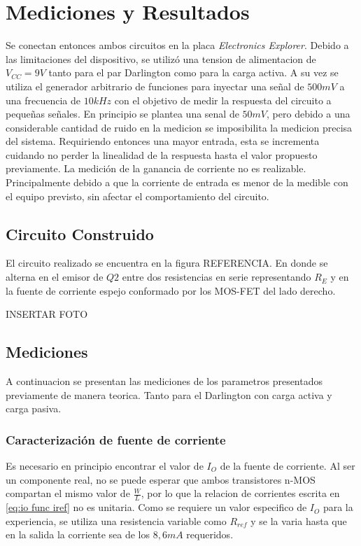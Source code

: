 \chapter{Mediciones y Resultados}
Se conectan entonces ambos circuitos en la placa \textit{Electronics Explorer}. Debido a las limitaciones del dispositivo, se utilizó una tension de alimentacion de $V_{CC} = 9V$ tanto para el par Darlington como para la carga activa.
A su vez se utiliza el generador arbitrario de funciones para inyectar una señal de $500 mV$ a una frecuencia de $10kHz$ con el objetivo de medir la respuesta del circuito a pequeñas señales. En principio se plantea una senal de $50 mV$, pero debido a una considerable cantidad de ruido en la medicion se imposibilita la medicion precisa del sistema.
Requiriendo entonces una mayor entrada, esta se incrementa cuidando no perder la linealidad de la respuesta hasta el valor propuesto previamente.
La medición de la ganancia de corriente no es realizable. Principalmente debido a que la corriente de entrada es menor de la medible con el equipo previsto, sin afectar el comportamiento del circuito.

\section{Circuito Construido}
El circuito realizado se encuentra en la figura REFERENCIA. En donde se alterna en el emisor de $Q2$ entre dos resistencias en serie representando $R_E$ y en la fuente de corriente espejo conformado por los MOS-FET del lado derecho.

INSERTAR FOTO


\section{Mediciones}
A continuacion se presentan las mediciones de los parametros presentados previamente de manera teorica. Tanto para el Darlington con carga activa y carga pasiva.

\subsection{Caracterización de fuente de corriente}

Es necesario en principio encontrar el valor de $I_O$ de la fuente de corriente. Al ser un componente real, no se puede esperar que ambos transistores n-MOS compartan el mismo valor de $\frac{W}{L}$, por lo que la relacion de corrientes escrita en \ref{eq:io func iref} no es unitaria.
Como se requiere un valor especifico de $I_O$ para la experiencia, se utiliza una resistencia variable como $R_{ref}$ y se la varia hasta que en la salida la corriente sea de los $8,6 mA$ requeridos.

